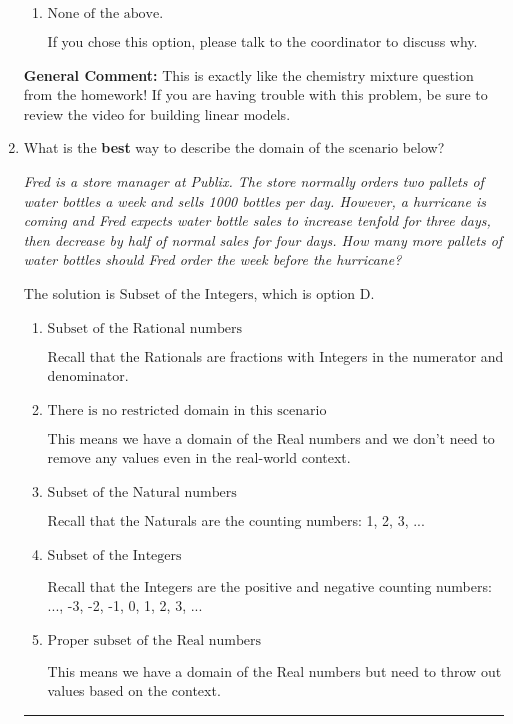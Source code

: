 \documentclass{extbook}[14pt]
\newcommand{\litem}[1]{\item #1

\rule{\textwidth}{0.4pt}}
\begin{document}
\begin{enumerate}
{\begin{enumerate}[label=\Alph*.]
This assumes that exactly half of the high- and low- quality beans are mixed to create the blended coffee beans.
\item \( \text{None of the above.} \)

If you chose this option, please talk to the coordinator to discuss why.
\end{enumerate}

\textbf{General Comment:} This is exactly like the chemistry mixture question from the homework! If you are having trouble with this problem, be sure to review the video for building linear models.
}
\litem{
What is the \textbf{best} way to describe the domain of the scenario below?

\begin{center}
    \textit{ Fred is a store manager at Publix. The store normally orders two pallets of water bottles a week and sells 1000 bottles per day. However, a hurricane is coming and Fred expects water bottle sales to increase tenfold for three days, then decrease by half of normal sales for four days. How many more pallets of water bottles should Fred order the week before the hurricane? }
\end{center}
The solution is \( \text{Subset of the Integers} \), which is option D.\begin{enumerate}[label=\Alph*.]
\item \( \text{Subset of the Rational numbers} \)

Recall that the Rationals are fractions with Integers in the numerator and denominator.
\item \( \text{There is no restricted domain in this scenario} \)

This means we have a domain of the Real numbers and we don't need to remove any values even in the real-world context.
\item \( \text{Subset of the Natural numbers} \)

Recall that the Naturals are the counting numbers: 1, 2, 3, ...
\item \( \text{Subset of the Integers} \)

Recall that the Integers are the positive and negative counting numbers: ..., -3, -2, -1, 0, 1, 2, 3, ... 
\item \( \text{Proper subset of the Real numbers} \)

This means we have a domain of the Real numbers but need to throw out values based on the context.
\end{enumerate}

}
\end{enumerate}
\end{document}
